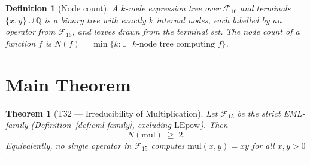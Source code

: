 \documentclass[11pt]{article}
\newtheorem{theorem}{Theorem}[section]
\newtheorem{definition}{Definition}[section]
\begin{document}
\begin{definition}[Node count]
A \emph{$k$-node expression tree} over $\mathcal{F}_{16}$ and terminals
$\{x,y\}\cup\mathbb{Q}$ is a binary tree with exactly $k$ internal nodes,
each labelled by an operator from $\mathcal{F}_{16}$, and leaves drawn from
the terminal set.  The node count of a function $f$ is
$N(f)=\min\{k : \exists\text{ $k$-node tree computing $f$}\}$.
\end{definition}

\section{Main Theorem}

\begin{theorem}[T32 --- Irreducibility of Multiplication]
\label{thm:T32}
Let $\mathcal{F}_{15}$ be the strict EML-family (Definition~\ref{def:eml-family},
excluding $\mathrm{LEpow}$).  Then
\[
  N(\mathrm{mul}) \;\geq\; 2.
\]
Equivalently, no single operator in $\mathcal{F}_{15}$ computes
$\mathrm{mul}(x,y)=xy$ for all $x,y>0$.
\end{theorem}
\end{document}

